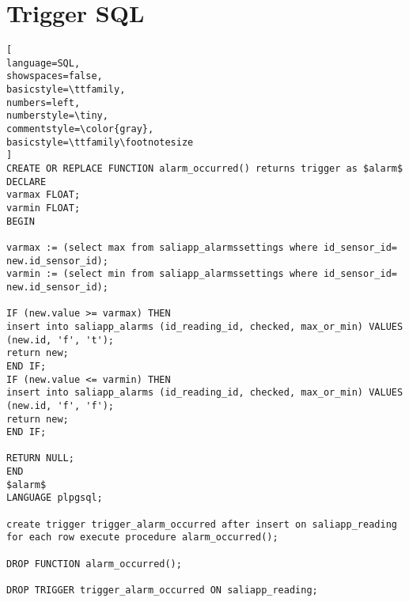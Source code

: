 \chapter{Trigger SQL }


\begin{lstlisting}[
language=SQL,
showspaces=false,
basicstyle=\ttfamily,
numbers=left,
numberstyle=\tiny,
commentstyle=\color{gray},
basicstyle=\ttfamily\footnotesize
]
CREATE OR REPLACE FUNCTION alarm_occurred() returns trigger as $alarm$ 
DECLARE
varmax FLOAT;
varmin FLOAT;
BEGIN

varmax := (select max from saliapp_alarmssettings where id_sensor_id= new.id_sensor_id);
varmin := (select min from saliapp_alarmssettings where id_sensor_id= new.id_sensor_id);

IF (new.value >= varmax) THEN 
insert into saliapp_alarms (id_reading_id, checked, max_or_min) VALUES (new.id, 'f', 't');
return new;
END IF;
IF (new.value <= varmin) THEN 
insert into saliapp_alarms (id_reading_id, checked, max_or_min) VALUES (new.id, 'f', 'f');
return new;
END IF;

RETURN NULL;
END
$alarm$
LANGUAGE plpgsql;

create trigger trigger_alarm_occurred after insert on saliapp_reading
for each row execute procedure alarm_occurred(); 

DROP FUNCTION alarm_occurred(); 

DROP TRIGGER trigger_alarm_occurred ON saliapp_reading;


\end{lstlisting}
